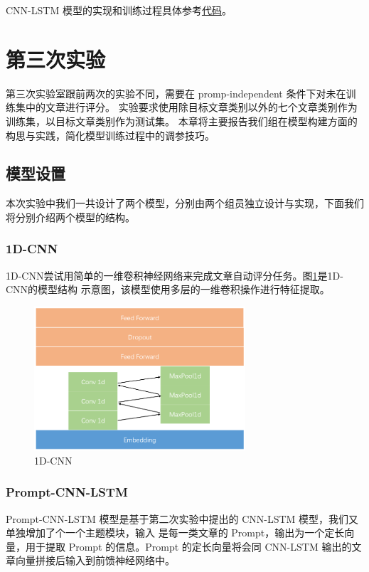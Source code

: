 \documentclass[UTF8]{article}
\begin{document}
CNN-LSTM 模型的实现和训练过程具体参考\href{https://github.com/Mandule/EssayAE/tree/master/HW2}{代码}。

\section{第三次实验}

第三次实验室跟前两次的实验不同，需要在 promp-independent 条件下对未在训练集中的文章进行评分。
实验要求使用除目标文章类别以外的七个文章类别作为训练集，以目标文章类别作为测试集。
本章将主要报告我们组在模型构建方面的构思与实践，简化模型训练过程中的调参技巧。

\subsection{模型设置}

本次实验中我们一共设计了两个模型，分别由两个组员独立设计与实现，下面我们将分别介绍两个模型的结构。

\subsubsection{1D-CNN}
1D-CNN尝试用简单的一维卷积神经网络来完成文章自动评分任务。图\ref{fig:1DCNN}是1D-CNN的模型结构
示意图，该模型使用多层的一维卷积操作进行特征提取。

\begin{figure}[h]
    \centering
    \includegraphics[width=0.7\textwidth]{fig/3.png}
    \caption{1D-CNN}
    \label{fig:1DCNN}
\end{figure}

\subsubsection{Prompt-CNN-LSTM}

Prompt-CNN-LSTM 模型是基于第二次实验中提出的 CNN-LSTM 模型，我们又单独增加了个一个主题模块，输入
是每一类文章的 Prompt，输出为一个定长向量，用于提取 Prompt 的信息。Prompt 的定长向量将会同 CNN-LSTM 
输出的文章向量拼接后输入到前馈神经网络中。
\end{document}
